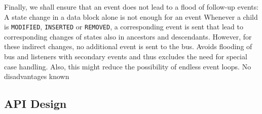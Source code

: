 Finally, we shall ensure that an event does not lead to a flood of follow-up events:
{%
A state change in a data block alone is not enough for an event
}
{%
Whenever a child is \texttt{MODIFIED}, \texttt{INSERTED} or \texttt{REMOVED}, a corresponding event is sent that lead to corresponding changes of states also in ancestors and descendants. However, for these indirect changes, no additional event is sent to the bus.
}
{%
Avoids flooding of bus and listeners with secondary events and thus excludes the need for special case handling. Also, this might reduce the possibility of endless event loops.
}
{%
No disadvantages known
}

\subsection{API Design}%
\label{sec:APIDesign}%

